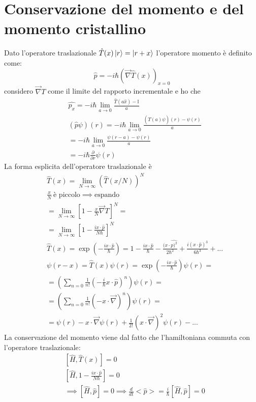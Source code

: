 \section{Conservazione del momento e del momento cristallino}
Dato l'operatore traslazionale $\hat{T}(x) \ket{r} = \ket{r+x}$ l'operatore momento è definito come:
\[ \hat{p} = -i \hbar \left( \vec{\nabla}\hat{T}(x) \right)_{x = 0}\]
considero $\vec{\nabla} T$ come il limite del rapporto incrementale e ho che 
\[ \begin{split}
    & \hat{p_x} = -i\hbar \lim_{a \to 0} \frac{\hat{T}(a\hat{x})-\mathbb{I}}{a} \\
    &(\hat{p}\psi)(r) = -i\hbar \lim_{a \to 0} \frac{(\hat{T}(a)\psi)(r) - \psi(r)}{a} \\
    & = -i\hbar \lim_{a \to 0} \frac{\psi(r-a)-\psi(r)}{a} \\
    & = -i\hbar\frac{\partial}{\partial r} \psi(r)
\end{split}\]
La forma esplicita dell'operatore traslazionale è
\[ \begin{split}
    &\hat{T}(x) = \lim_{N \to \infty} \left( \hat{T} (x/N)\right)^N \\
    &\frac{x}{N} \ \text{è piccolo} \implies \text{espando} \\
    & = \lim_{N \to \infty} \left[ 1-\frac{x}{N}\vec{\nabla} T \right]^N =\\
    & = \lim_{N \to \infty} \left[ 1-\frac{ix\cdot \hat{p}}{N\hbar} \right]^N \\
    & \hat{T}(x) = \exp\left( -\frac{ix\cdot \hat{p}}{\hbar}\right) = 1 - \frac{ix\cdot \hat{p}}{\hbar} - \frac{(x\cdot \hat{p)^2}}{2\hbar^2} + \frac{i(x\cdot \hat{p})^3}{6\hbar^3}+... \\
    & \psi(r-x) = \hat{T}(x)\psi(r) = \exp\left(-  \frac{ix\cdot \hat{p}}{\hbar}\right)\psi(r) = \\
    & = \left( \sum_{n = 0} \frac{1}{n!} \left(  - \frac{i}{\hbar}x \cdot \hat{p}\right)^n\right) \psi(r) = \\
    & = \left( \sum_{n = 0} \frac{1}{n!} \left( -x \cdot\vec{\nabla}\right)^n\right) \psi(r) = \\
    & = \psi(r) - x \cdot \vec{\nabla}\psi(r) + \frac{1}{2!}(x \cdot \vec{\nabla})^2\psi(r)-...
\end{split}\]
La conservazione del momento viene dal fatto che l'hamiltoniana commuta con l'operatore traslazionale:
\[ \begin{split}
    &\left[ \hat{H}, \hat{T}(x) \right] = 0 \\
    & \left[ \hat{H}, 1-\frac{i x \cdot \hat{p}}{N\hbar} \right] = 0 \\
    & \implies \left[ \hat{H}, \hat{p} \right] = 0 \implies \frac{d}{dt}<\hat{p}> = \frac{i}{\hbar}\left[ \hat{H}, \hat{p} \right] = 0
\end{split}\]
